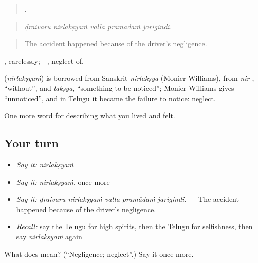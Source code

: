 \begin{quote}
    .
\end{quote}

\begin{quote}
\emph{ḍraivaru nirlakṣyaṁ valla pramādaṁ jarigindi.}
\end{quote}

\begin{quote}
The accident happened because of the driver's negligence.
\end{quote}

, carelessly; - , neglect of.

\begin{cousinweb}
\textbf{} (\emph{nirlakṣyaṁ}) is borrowed from Sanskrit \emph{nirlakṣya} (Monier-Williams), from \emph{nir-}, \textquotedblleft{}without\textquotedblright{}, and \emph{lakṣya}, \textquotedblleft{}something to be noticed\textquotedblright{}; Monier-Williams gives \textquotedblleft{}unnoticed\textquotedblright{}, and in Telugu it became the failure to notice: neglect.
\end{cousinweb}

\begin{grammarlens}[title={What you've built}]
One more word for describing what you lived and felt.
\end{grammarlens}

\subsection*{Your turn}
\begin{itemize}
\raggedright
  \item \emph{Say it:} \emph{nirlakṣyaṁ}
  \item \emph{Say it:} \emph{nirlakṣyaṁ}, once more
  \item \emph{Say it:} \emph{ḍraivaru nirlakṣyaṁ valla pramādaṁ jarigindi.} — The accident happened because of the driver's negligence.
  \item \emph{Recall:} say the Telugu for high spirits, then the Telugu for selfishness, then say \emph{nirlakṣyaṁ} again
\end{itemize}

\begin{tcolorbox}[breakable,colback=teal!4,colframe=teal!35!black,title={Before you move on}]
What does  mean? (\textquotedblleft{}Negligence; neglect\textquotedblright{}.) Say it once more.
\end{tcolorbox}
